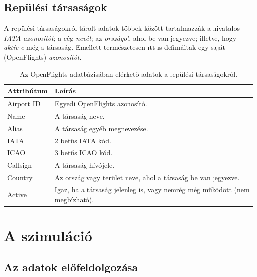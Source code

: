     \subsection{Repülési társaságok}

    A repülési társaságokról tárolt adatok többek között tartalmazzák a hivatalos \emph{IATA azonosítót}; a cég \emph{nevét}; az \emph{országot}, ahol be van jegyezve; illetve, hogy \emph{aktív-e} még a társaság. Emellett természetesen itt is definiáltak egy saját (OpenFlights) \emph{azonosítót}.

    \begin{table}[ht]
      \footnotesize
      \centering
      \caption{Az OpenFlights adatbázisában elérhető adatok a repülési társaságokról.}
      \begin{tabular}{ | l | l |}
      \hline
      Attribútum & Leírás \\ \hline
      Airport ID & Egyedi OpenFlights azonosító.\\
      Name & A társaság neve.\\
      Alias & A társaság egyéb megnevezése.\\
      IATA & 2 betűs IATA kód.\\
      ICAO & 3 betűs ICAO kód.\\
      Callsign & A társaság hívójele.\\
      Country & Az ország vagy terület neve, ahol a társaság be van jegyezve.\\
      Active & Igaz, ha a társaság jelenleg is, vagy nemrég még működött (nem megbízható).\\
      \hline
      \end{tabular}
      \label{tab:table_repulesitarsasagok}
    \end{table}

  \section{A szimuláció}
    \subsection{Az adatok előfeldolgozása}

